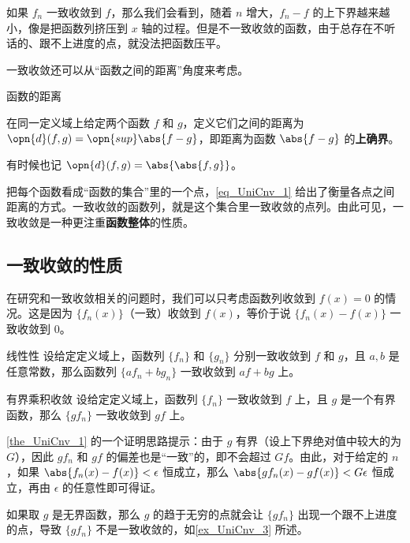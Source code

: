 如果 $f_n$ 一致收敛到 $f$，那么我们会看到，随着 $n$ 增大，$f_n-f$ 的上下界越来越小，像是把函数列挤压到 $x$ 轴的过程。但是不一致收敛的函数，由于总存在不听话的、跟不上进度的点，就没法把函数压平。

一致收敛还可以从“函数之间的距离”角度来考虑。

\begin{definition}{函数的距离}\label{def_UniCnv_1}

在同一定义域上给定两个函数 $f$ 和 $g$，定义它们之间的距离为 $\opn{d}(f, g)=\opn{sup}\abs{f-g}$，即距离为函数 $\abs{f-g}$ 的\textbf{上确界}。

有时候也记 $\opn{d}(f, g)=\abs{\abs{f, g}}$。

\end{definition}

把每个函数看成“函数的集合”里的一个点，\autoref{eq_UniCnv_1} 给出了衡量各点之间距离的方式。一致收敛的函数列，就是这个集合里一致收敛的点列。由此可见，一致收敛是一种更注重\textbf{函数整体}的性质。


\subsection{一致收敛的性质}

在研究和一致收敛相关的问题时，我们可以只考虑函数列收敛到 $f(x)=0$ 的情况。这是因为 $\{f_n(x)\}$（一致）收敛到 $f(x)$，等价于说 $\{f_n(x)-f(x)\}$ 一致收敛到 $0$。

\begin{theorem}{线性性}
设给定定义域上，函数列 $\{f_n\}$ 和 $\{g_n\}$ 分别一致收敛到 $f$ 和 $g$，且 $a, b$ 是任意常数，那么函数列 $\{af_n+bg_n\}$ 一致收敛到 $af+bg$ 上。
\end{theorem}

\begin{theorem}{有界乘积收敛}\label{the_UniCnv_1}
设给定定义域上，函数列 $\{f_n\}$ 一致收敛到 $f$ 上，且 $g$ 是一个有界函数，那么 $\{gf_n\}$ 一致收敛到 $gf$ 上。
\end{theorem}

\autoref{the_UniCnv_1} 的一个证明思路提示：由于 $g$ 有界（设上下界绝对值中较大的为 $G$），因此 $gf_n$ 和 $gf$ 的偏差也是“一致”的，即不会超过 $Gf$。由此，对于给定的 $n$，如果 $\abs{f_n(x)-f(x)}<\epsilon$ 恒成立，那么 $\abs{gf_n(x)-gf(x)}<G\epsilon$ 恒成立，再由 $\epsilon$ 的任意性即可得证。

如果取 $g$ 是无界函数，那么 $g$ 的趋于无穷的点就会让 $\{gf_n\}$ 出现一个跟不上进度的点，导致 $\{gf_n\}$ 不是一致收敛的，如\autoref{ex_UniCnv_3} 所述。

